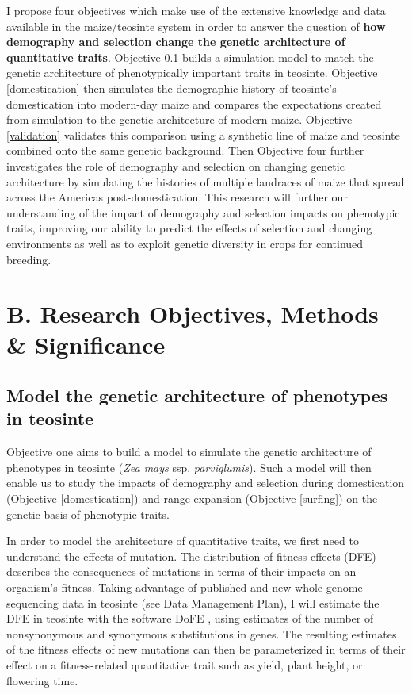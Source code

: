 I propose four objectives which make use of the extensive knowledge and data available in the maize\//teosinte system in order to answer the question of \textbf{how demography and selection change the genetic architecture of quantitative traits}. Objective \ref{modeling} builds a simulation model to match the genetic architecture of phenotypically important traits in teosinte. Objective \ref{domestication} then simulates the demographic history of teosinte's domestication into modern-day maize and compares the expectations created from simulation to the genetic architecture of modern maize. Objective \ref{validation} validates this comparison using a synthetic line of maize and teosinte combined onto the same genetic background. Then Objective four further investigates the role of demography and selection on changing genetic architecture by simulating the histories of multiple landraces of maize that spread across the Americas post-domestication. This research will further our understanding of the impact of demography and selection impacts on phenotypic traits, improving our ability to predict the effects of selection and changing environments as well as to exploit genetic diversity in crops for continued breeding.



\section*{B. Research Objectives, Methods \& Significance}

\renewcommand\thesubsection{\Roman {subsection}.}

\subsection{Model the genetic architecture of phenotypes in teosinte}
\label{modeling}
Objective one aims to build a model to simulate the genetic architecture of phenotypes in teosinte (\emph{Zea mays} ssp. \emph{parviglumis}).  Such a model will then enable us to study the impacts of demography and selection during domestication (Objective \ref{domestication}) and range expansion (Objective \ref{surfing}) on the genetic basis of phenotypic traits.

In order to model the architecture of quantitative traits, we first need to understand the effects of mutation.  The distribution of fitness effects (DFE) describes the consequences of mutations in terms of their impacts on an organism's fitness. Taking advantage of published \citep{Chia:2012} and new whole-genome sequencing data in teosinte (see Data Management Plan), I will estimate the DFE in teosinte with the software DoFE \citep{Keightley:2007hq, Stoletzki:2011}, using estimates of the number of nonsynonymous and synonymous substitutions in genes.
The resulting estimates of the fitness effects of new mutations can then be parameterized in terms of their effect on a fitness-related quantitative trait \citep{Keightley:1988, eyre-walker:2010} such as yield, plant height, or flowering time.

